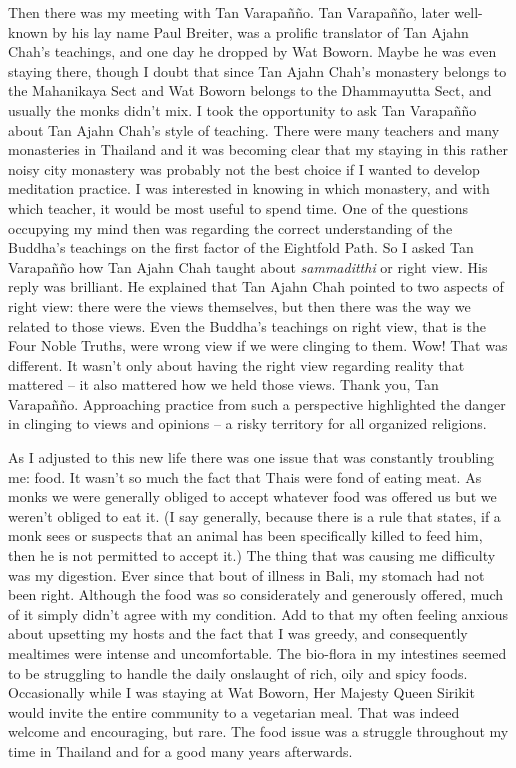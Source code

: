 Then there was my meeting with Tan Varapañño. Tan Varapañño, later
well-known by his lay name Paul Breiter, was a prolific translator of
Tan Ajahn Chah's teachings, and one day he dropped by Wat Boworn. Maybe
he was even staying there, though I doubt that since Tan Ajahn Chah's
monastery belongs to the Mahanikaya Sect and Wat Boworn belongs to the
Dhammayutta Sect, and usually the monks didn't mix. I took the
opportunity to ask Tan Varapañño about Tan Ajahn Chah's style of
teaching. There were many teachers and many monasteries in Thailand and
it was becoming clear that my staying in this rather noisy city
monastery was probably not the best choice if I wanted to develop
meditation practice. I was interested in knowing in which monastery, and
with which teacher, it would be most useful to spend time. One of the
questions occupying my mind then was regarding the correct understanding
of the Buddha's teachings on the first factor of the Eightfold Path. So
I asked Tan Varapañño how Tan Ajahn Chah taught about \emph{sammaditthi}
or right view. His reply was brilliant. He explained that Tan Ajahn Chah
pointed to two aspects of right view: there were the views themselves,
but then there was the way we related to those views. Even the Buddha's
teachings on right view, that is the Four Noble Truths, were wrong view
if we were clinging to them. Wow! That was different. It wasn't only
about having the right view regarding reality that mattered -- it also
mattered how we held those views. Thank you, Tan Varapañño. Approaching
practice from such a perspective highlighted the danger in clinging to
views and opinions -- a risky territory for all organized religions.

As I adjusted to this new life there was one issue that was constantly
troubling me: food. It wasn't so much the fact that Thais were fond of
eating meat. As monks we were generally obliged to accept whatever food
was offered us but we weren't obliged to eat it. (I say generally,
because there is a rule that states, if a monk sees or suspects that an
animal has been specifically killed to feed him, then he is not
permitted to accept it.) The thing that was causing me difficulty was my
digestion. Ever since that bout of illness in Bali, my stomach had not
been right. Although the food was so considerately and generously
offered, much of it simply didn't agree with my condition. Add to that
my often feeling anxious about upsetting my hosts and the fact that I
was greedy, and consequently mealtimes were intense and uncomfortable.
The bio-flora in my intestines seemed to be struggling to handle the
daily onslaught of rich, oily and spicy foods. Occasionally while I was
staying at Wat Boworn, Her Majesty Queen Sirikit would invite the entire
community to a vegetarian meal. That was indeed welcome and encouraging,
but rare. The food issue was a struggle throughout my time in Thailand
and for a good many years afterwards.

